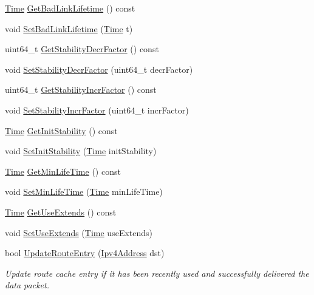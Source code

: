 \begin{DoxyCompactItemize}
\hyperlink{classns3_1_1Time}{Time} \hyperlink{classns3_1_1dsr_1_1DsrRouteCache_a8f62123e7da2576be2ca294c11092355}{Get\+Bad\+Link\+Lifetime} () const 
\item 
void \hyperlink{classns3_1_1dsr_1_1DsrRouteCache_a0827bf4c2148fbcd10f2a64244547ad5}{Set\+Bad\+Link\+Lifetime} (\hyperlink{classns3_1_1Time}{Time} t)
\item 
uint64\+\_\+t \hyperlink{classns3_1_1dsr_1_1DsrRouteCache_abcf38af360eb4478b02312fbd0507005}{Get\+Stability\+Decr\+Factor} () const 
\item 
void \hyperlink{classns3_1_1dsr_1_1DsrRouteCache_a22f56fe8b03dda3e55e50c7ad1ceef70}{Set\+Stability\+Decr\+Factor} (uint64\+\_\+t decr\+Factor)
\item 
uint64\+\_\+t \hyperlink{classns3_1_1dsr_1_1DsrRouteCache_a5483251b00f51f742e104c0bcb67766a}{Get\+Stability\+Incr\+Factor} () const 
\item 
void \hyperlink{classns3_1_1dsr_1_1DsrRouteCache_acc5143f73a6a7afcb55d92287822d0f3}{Set\+Stability\+Incr\+Factor} (uint64\+\_\+t incr\+Factor)
\item 
\hyperlink{classns3_1_1Time}{Time} \hyperlink{classns3_1_1dsr_1_1DsrRouteCache_a321108b583f5c4f443c87a51cf5a0940}{Get\+Init\+Stability} () const 
\item 
void \hyperlink{classns3_1_1dsr_1_1DsrRouteCache_a194d5a177dcdaea80edc1979b27780c9}{Set\+Init\+Stability} (\hyperlink{classns3_1_1Time}{Time} init\+Stability)
\item 
\hyperlink{classns3_1_1Time}{Time} \hyperlink{classns3_1_1dsr_1_1DsrRouteCache_ad29c3416ce230f84b96f51717c8d00a4}{Get\+Min\+Life\+Time} () const 
\item 
void \hyperlink{classns3_1_1dsr_1_1DsrRouteCache_a473fb8e279e37d25ef6de9ebee5c68c7}{Set\+Min\+Life\+Time} (\hyperlink{classns3_1_1Time}{Time} min\+Life\+Time)
\item 
\hyperlink{classns3_1_1Time}{Time} \hyperlink{classns3_1_1dsr_1_1DsrRouteCache_aeb5763060d894cd9a08b1f08761c5a23}{Get\+Use\+Extends} () const 
\item 
void \hyperlink{classns3_1_1dsr_1_1DsrRouteCache_a91aa79ee0a12600154097f1e379154b6}{Set\+Use\+Extends} (\hyperlink{classns3_1_1Time}{Time} use\+Extends)
\item 
bool \hyperlink{classns3_1_1dsr_1_1DsrRouteCache_acce562219fbd57b6fc9b6659f444d700}{Update\+Route\+Entry} (\hyperlink{classns3_1_1Ipv4Address}{Ipv4\+Address} dst)
\begin{DoxyCompactList}\small\item\em Update route cache entry if it has been recently used and successfully delivered the data packet. \end{DoxyCompactList}\item 

\end{DoxyCompactItemize}
